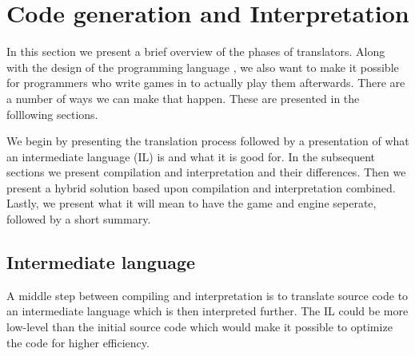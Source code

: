 \section{Code generation and Interpretation}
\label{sec:codegenerationandinterpretation}

In this section we present a brief overview of the phases of translators. Along with the design of the programming
language \productname{}, we also want to make it possible for programmers who
write games in \productname{} to actually play them afterwards. There are a
number of ways we can make that happen. These are presented in the folllowing
sections. 

We begin by presenting the translation process followed by a presentation of
what an intermediate language (IL) is and what it is good for. In the subsequent
sections we present compilation and interpretation and their differences. Then
we present a hybrid solution based upon compilation and interpretation combined.
Lastly, we present what it will mean to have the game and engine seperate,
followed by a short summary.



%

\subsection{Intermediate language}
\label{sec:intermediatelanguage}
A middle step between compiling and interpretation is to translate source code to an
intermediate language which is then interpreted further. The IL could be more
low-level than the initial source code which would make it possible to optimize the code for higher
efficiency.

